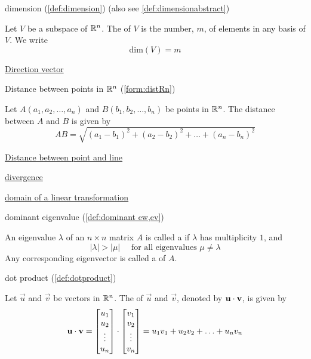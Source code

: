 \documentclass{ximera}
\begin{document}
dimension (\ref{def:dimension}) (also see \ref{def:dimensionabstract})
\begin{expandable}
    Let $V$ be a subspace of $\mathbb{R}^n$.  The  of $V$ is the number, $m$, of elements in any basis of $V$.  We write
$$\mbox{dim}(V)=m$$
\end{expandable}

\href{https://ximera.osu.edu/oerlinalg/LinearAlgebra/RRN-0020/main}{Direction vector}

Distance between points in $\mathbb{R}^n$ (\ref{form:distRn})
\begin{expandable}
Let $A(a_1, a_2,\ldots ,a_n)$ and $B(b_1, b_2,\ldots ,b_n)$ be points in $\mathbb{R}^n$.  The distance between $A$ and $B$ is given by
$$AB=\sqrt{(a_1-b_1)^2+(a_2-b_2)^2+\ldots +(a_n-b_n)^2}$$
\end{expandable}

\href{https://ximera.osu.edu/oerlinalg/LinearAlgebra/VEC-0070/main}{Distance between point and line}

\href{https://ximera.osu.edu/oerlinalg/LinearAlgebra/SYS-0040/main}{divergence}

\href{https://ximera.osu.edu/oerlinalg/LinearAlgebra/LTR-0010/main}{domain of a linear transformation} 

dominant eigenvalue (\ref{def:dominant ew,ev})
\begin{expandable}
    An eigenvalue $\lambda$ of an $n \times n$ matrix $A$ is called a  if $\lambda$ has multiplicity $1$, and
\begin{equation*}
|\lambda| > |\mu| \quad \mbox{ for all eigenvalues } \mu \neq \lambda
\end{equation*}
Any corresponding eigenvector is called a  of $A$.
\end{expandable}

dot product (\ref{def:dotproduct})
\begin{expandable}
  Let $\vec{u}$ and $\vec{v}$ be vectors in $\mathbb{R}^n$.  The  of $\vec{u}$ and $\vec{v}$, denoted by
  $\mathbf{u}\cdot \mathbf{v}$, is given by
$$\mathbf{u}\cdot\mathbf{v}=\begin{bmatrix}u_1\\u_2\\\vdots\\u_n\end{bmatrix}\cdot\begin{bmatrix}v_1\\v_2\\\vdots\\v_n\end{bmatrix}=u_1v_1+u_2v_2+\ldots+u_nv_n$$
\end{expandable}
\end{document}
